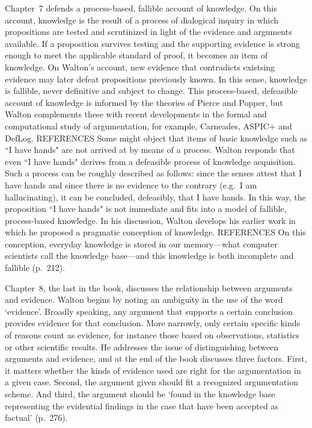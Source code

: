 \documentclass[12pt]{article}
\begin{document}
Chapter~7 defends a process-based, fallible account of knowledge. On
this account, knowledge is the result of a process of dialogical inquiry in which
propositions are tested and scrutinized in light of the evidence and arguments
available. If a proposition survives testing and the supporting evidence is
strong enough to meet the applicable standard of proof, it becomes an item of
knowledge. On Walton's account, new evidence that contradicts existsing evidence 
may later defeat propositions previously known. In this sense, 
knowledge is fallible, never definitive and subject to change. 
This process-based, defeasible
account of knowledge is informed by the theories of Pierce and Popper,
but Walton complements these with recent developments in the formal and computational study of argumentation,
for example, Carneades, ASPIC+ and DefLog. REFERENCES
Some might object that items of basic knowledge such as ``I have hands"
are not arrived at by means of a process. Walton responds that even ``I
have hands" derives from a defeasible process of knowledge
acquisition. Such a process can be roughly described as follows: 
since the senses attest that I have hands 
and since there is no evidence to the contrary (e.g.\ I am hallucinating), it can be concluded, defeasibly,
that I have hands. In this way, the proposition ``I have hands" is not immediate and fits into a model of fallible, process-based
knowledge. In his discussion, Walton develops his earlier work in which he proposed a pragmatic 
conception of knowledge. REFERENCES On this conception, 
everyday knowledge is stored in our memory---what computer scientists 
call the knowledge base---and this knowledge is both incomplete 
and fallible (p.\ 212).

Chapter~8, the last in the book, discusses the relationship between
arguments and evidence. Walton begins by noting an ambiguity in the
use of the word `evidence'. Broadly speaking, any argument that
supports a certain conclusion provides evidence for that conclusion. More
narrowly, only certain specific kinds of reasons count as evidence, for instance those based on observations, statistics or other scientific results. He addresses the issue of distinguishing between arguments and evidence, and at the end of the book discusses three factors. First, it matters whether the kinds of evidence used are right for the argumentation in a given case. Second, the argument given should fit a recognized argumentation scheme. 
And third, the argument should be `found in the knowledge base representing the evidential findings in the case that have been accepted as factual'
(p.\ 276).
\end{document}
